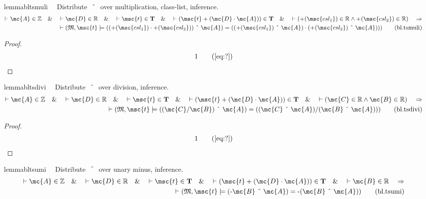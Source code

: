 \begin{restatable}{lemma}{bltsmuli}~~ Distribute $~\string^~$ over
multiplication, class-list, inference.
\begin{align}
\vdash \mc{A} \in \mathbb{Z}\quad\&\quad \vdash \mc{D} \in
    \mathbb{R}\quad\&\quad \vdash \msc{t} \in \mathbf{T}\quad\&\quad \vdash (
    \msc{t} + ( \mc{D} \cdot \mc{A} ) ) \in \mathbf{T}\quad\&\quad \vdash ( +(
    \msc{csl_1} ) \in \mathbb{R} \wedge +( \msc{csl_2} ) \in \mathbb{R}
    )\quad\Rightarrow \notag \\ 
	\quad \vdash ( \mathfrak{M} , \msc{t} \models ( ( +(
    \msc{csl_1} ) \cdot +( \msc{csl_2} ) ) ~\string^~ \mc{A} ) = ( ( +(
    \msc{csl_1} ) ~\string^~ \mc{A} ) \cdot ( +( \msc{csl_2} ) ~\string^~
    \mc{A} ) ) )\label{eq:bl.tsmuli}\tag{bl.tsmuli}
\end{align}
\end{restatable}

\begin{proof}
\begin{align}
  1 &&  & &(\mbox{\ref{eq:?}})\notag
\end{align}
\end{proof}

\begin{restatable}{lemma}{bltsdivi}~~ Distribute $~\string^~$ over division,
inference.
\begin{align}
\vdash \mc{A} \in \mathbb{Z}\quad\&\quad \vdash \mc{D} \in
    \mathbb{R}\quad\&\quad \vdash \msc{t} \in \mathbf{T}\quad\&\quad \vdash (
    \msc{t} + ( \mc{D} \cdot \mc{A} ) ) \in \mathbf{T}\quad\&\quad \vdash (
    \mc{C} \in \mathbb{R} \wedge \mc{B} \in \mathbb{R} )\quad\Rightarrow \notag \\ 
	\quad
    \vdash ( \mathfrak{M} , \msc{t} \models ( ( \mc{C} / \mc{B} ) ~\string^~
    \mc{A} ) = ( ( \mc{C} ~\string^~ \mc{A} ) / ( \mc{B} ~\string^~ \mc{A} ) )
    )\label{eq:bl.tsdivi}\tag{bl.tsdivi}
\end{align}
\end{restatable}

\begin{proof}
\begin{align}
  1 &&  & &(\mbox{\ref{eq:?}})\notag
\end{align}
\end{proof}

\begin{restatable}{lemma}{bltsumi}~~ Distribute $~\string^~$ over unary minus,
inference.
\begin{align}
\vdash \mc{A} \in \mathbb{Z}\quad\&\quad \vdash \mc{D} \in
    \mathbb{R}\quad\&\quad \vdash \msc{t} \in \mathbf{T}\quad\&\quad \vdash (
    \msc{t} + ( \mc{D} \cdot \mc{A} ) ) \in \mathbf{T}\quad\&\quad \vdash
    \mc{B} \in \mathbb{R}\quad\Rightarrow \notag \\ 
	\quad \vdash ( \mathfrak{M} , \msc{t}
    \models ( \textrm{-} \mc{B} ~\string^~ \mc{A} ) = \textrm{-} ( \mc{B}
    ~\string^~ \mc{A} ) )\label{eq:bl.tsumi}\tag{bl.tsumi}
\end{align}
\end{restatable}

